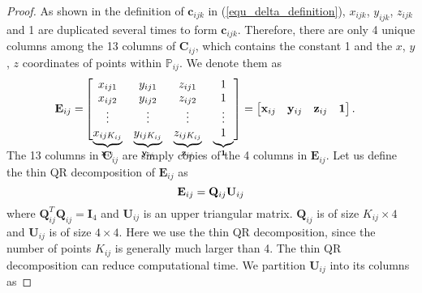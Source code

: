 \documentclass{vgtc}                          %
\newcommand\undermat[2]{%
	\smash{\underbrace{{%
				\begin{matrix}#2\end{matrix}}}_{{\color{black}#1}}}\vphantom{#2}}
\begin{document}
\begin{proof}
	As shown in the definition of $\mathbf{c}_{ijk}$ in (\ref{equ_delta_definition}), $x_{ijk}$, $y_{ijk}$, $z_{ijk}$  and 1 are duplicated several times  to form $\mathbf{c}_{ijk}$. Therefore, there are only 4 unique columns  among the 13 columns of $\mathbf{C}_{ij}$, which contains the constant 1 and the  $x$, $y$, $z$ coordinates of points within $\mathbb{P}_{ij}$. We denote them as
	\begin{equation}  \label{equ_qr_E_ij}	
	\begin{split}\mathbf{E}_{ij} = &
		\begin{bmatrix}
			x_{ij1} & y_{ij1} & z_{ij1} & 1 \\
			x_{ij2} & y_{ij2} & z_{ij2} & 1 \\
			\vdots  & \vdots  & \vdots  & \vdots \\
			\undermat{\mathbf{x}_{ij}}{x_{ijK_{ij}}} & \undermat{\mathbf{y}_{ij}}{y_{ijK_{ij}}} & \undermat{\mathbf{z}_{ij}}{z_{ijK_{ij}} }& \undermat{\mathbf{1}}{1}
		\end{bmatrix} 
		= \begin{bmatrix}
			\mathbf{x}_{ij} & \mathbf{y}_{ij} & \mathbf{z}_{ij} & \mathbf{1}
		\end{bmatrix}.
	\end{split} 
	\end{equation}
	 The 13 columns in $\mathbf{C}_{ij}$ are  simply copies of the 4 columns in $\mathbf{E}_{ij}$. 
	  Let us define the   thin QR decomposition \cite{golub2012matrix}   of $\mathbf{E}_{ij}$  as  
	 \begin{equation} \label{equ_E_qr}
	 \mathbf{E}_{ij} =  \mathbf{Q}_{ij}\mathbf{U}_{ij}\\
	 \end{equation}
	 where  $\mathbf{Q}_{ij}^{T}\mathbf{Q}_{ij} = \mathbf{I}_{4}$ and $\mathbf{U}_{ij}$ is an upper triangular matrix. $\mathbf{Q}_{ij}$ is of  size $K_{ij} \times 4$  and $\mathbf{U}_{ij}$ is of  size $4 \times 4$. Here we use the  thin QR decomposition, since  the number of points $K_{ij}$ is generally much larger than 4.  The thin QR decomposition can reduce computational time. We partition $\mathbf{U}_{ij}$ into its columns as

\end{proof}
\end{document}
